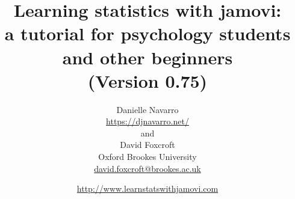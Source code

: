 


\date{\url{http://www.learnstatswithjamovi.com} \hfill \\ }
\title{Learning statistics with jamovi:\\ a tutorial for psychology students and other beginners \vspace*{12pt}
\\ (Version 0.75) \\ \vspace*{24pt}}
\author{Danielle Navarro \\ \url{https://djnavarro.net/} \vspace*{12pt} \\
and \vspace*{12pt} \\
David Foxcroft \\ Oxford Brookes University \\ \url{david.foxcroft@brookes.ac.uk} \vspace*{36pt}}


 